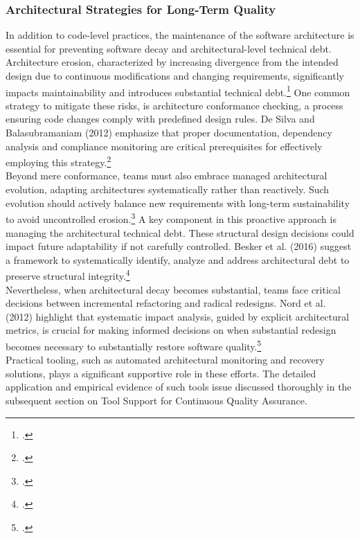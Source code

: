 \subsubsection{Architectural Strategies for Long-Term Quality}
In addition to code-level practices, the maintenance of the software architecture is essential for preventing software decay and architectural-level technical debt. 
Architecture erosion, characterized by increasing divergence from the intended design due to continuous modifications and changing requirements,
significantly impacts maintainability and introduces substantial technical debt.\footcite[1]{desilvaControllingSoftwareArchitecture2012}
One common strategy to mitigate these risks,  is architecture conformance checking, a process ensuring code changes comply with predefined design rules.
De Silva and Balasubramaniam (2012) emphasize that proper documentation, dependency analysis and compliance monitoring are critical prerequisites for
effectively employing this strategy.\footcite[135]{desilvaControllingSoftwareArchitecture2012}\\
Beyond mere conformance, teams must also embrace managed architectural evolution, adapting architectures systematically rather than reactively. Such evolution
should actively balance new requirements with long-term sustainability to avoid uncontrolled erosion.\footcite[34]{liUnderstandingSoftwareArchitecture2022}
A key component in this proactive approach is managing the architectural technical debt. These structural design decisions could impact future adaptability if not
carefully controlled. Besker et al. (2016) suggest a framework to systematically identify, analyze and address architectural debt to preserve structural integrity.\footcite[11]{beskerManagingArchitecturalTechnical2018}\\
Nevertheless, when architectural decay becomes substantial, teams face critical decisions between incremental refactoring and radical redesigns.
Nord et al. (2012) highlight that systematic impact analysis, guided by explicit architectural metrics, is crucial for making informed decisions on when substantial 
redesign becomes necessary to substantially restore software quality.\footcite[99]{nordSearchMetricManaging2012}\\
Practical tooling, such as automated architectural monitoring and recovery solutions, plays a significant supportive role in these efforts. 
The detailed application and empirical evidence of such tools issue discussed thoroughly in the subsequent section on Tool Support for Continuous Quality Assurance.\\

